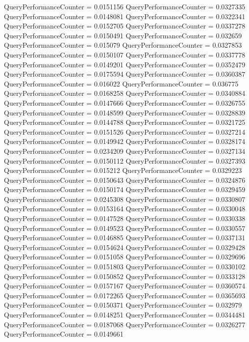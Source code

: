 \documentclass[9pt]{article}
\theoremstyle{plain}
\theoremstyle{definition}
\theoremstyle{remark}
\numberwithin{equation}{section}
\begin{document}
QueryPerformanceCounter  =  0.0151156
QueryPerformanceCounter  =  0.0327335
QueryPerformanceCounter  =  0.0148081
QueryPerformanceCounter  =  0.0322341
QueryPerformanceCounter  =  0.0152705
QueryPerformanceCounter  =  0.0337278
QueryPerformanceCounter  =  0.0150491
QueryPerformanceCounter  =  0.032659
QueryPerformanceCounter  =  0.015079
QueryPerformanceCounter  =  0.0327853
QueryPerformanceCounter  =  0.0150107
QueryPerformanceCounter  =  0.0337778
QueryPerformanceCounter  =  0.0149201
QueryPerformanceCounter  =  0.0352479
QueryPerformanceCounter  =  0.0175594
QueryPerformanceCounter  =  0.0360387
QueryPerformanceCounter  =  0.016022
QueryPerformanceCounter  =  0.036775
QueryPerformanceCounter  =  0.0168258
QueryPerformanceCounter  =  0.0340884
QueryPerformanceCounter  =  0.0147666
QueryPerformanceCounter  =  0.0326755
QueryPerformanceCounter  =  0.0148599
QueryPerformanceCounter  =  0.0328839
QueryPerformanceCounter  =  0.0144788
QueryPerformanceCounter  =  0.0321725
QueryPerformanceCounter  =  0.0151526
QueryPerformanceCounter  =  0.0327214
QueryPerformanceCounter  =  0.0149942
QueryPerformanceCounter  =  0.0328174
QueryPerformanceCounter  =  0.0234209
QueryPerformanceCounter  =  0.0327134
QueryPerformanceCounter  =  0.0150112
QueryPerformanceCounter  =  0.0327393
QueryPerformanceCounter  =  0.015212
QueryPerformanceCounter  =  0.0329223
QueryPerformanceCounter  =  0.0150643
QueryPerformanceCounter  =  0.0324876
QueryPerformanceCounter  =  0.0150174
QueryPerformanceCounter  =  0.0329459
QueryPerformanceCounter  =  0.0245308
QueryPerformanceCounter  =  0.0330807
QueryPerformanceCounter  =  0.0153164
QueryPerformanceCounter  =  0.0330048
QueryPerformanceCounter  =  0.0147528
QueryPerformanceCounter  =  0.0330338
QueryPerformanceCounter  =  0.0149523
QueryPerformanceCounter  =  0.0330557
QueryPerformanceCounter  =  0.0146885
QueryPerformanceCounter  =  0.0337131
QueryPerformanceCounter  =  0.0154624
QueryPerformanceCounter  =  0.0329428
QueryPerformanceCounter  =  0.0151058
QueryPerformanceCounter  =  0.0329696
QueryPerformanceCounter  =  0.0151803
QueryPerformanceCounter  =  0.0330102
QueryPerformanceCounter  =  0.0150852
QueryPerformanceCounter  =  0.0333128
QueryPerformanceCounter  =  0.0157167
QueryPerformanceCounter  =  0.0360574
QueryPerformanceCounter  =  0.0172265
QueryPerformanceCounter  =  0.0365693
QueryPerformanceCounter  =  0.0150371
QueryPerformanceCounter  =  0.032979
QueryPerformanceCounter  =  0.0148251
QueryPerformanceCounter  =  0.0344481
QueryPerformanceCounter  =  0.0187068
QueryPerformanceCounter  =  0.0326277
QueryPerformanceCounter  =  0.0149661
\end{document}
